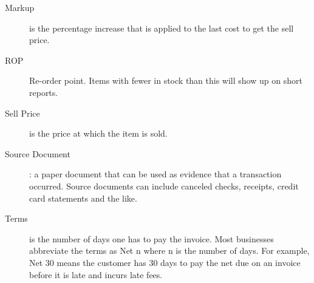 \documentclass{article}
\begin{document}
\begin{description}
\item[Markup] is the percentage increase that is applied to the last cost to get the sell price.
\item[ROP] Re-order point.  Items with fewer in stock than this will show up on
short reports.
\item[Sell Price] is the price at which the item is sold.
\item[Source Document]: a paper document that can be used as evidence that a
transaction occurred.  Source documents can include canceled checks, receipts,
credit card statements and the like. 
\item[Terms] is the number of days one has to pay the invoice.  Most businesses
abbreviate the terms as Net n where n is the number of days.  For example, Net 30
means the customer has 30 days to pay the net due on an invoice before it is
late and incurs late fees.
\end{description}


\end{document}

